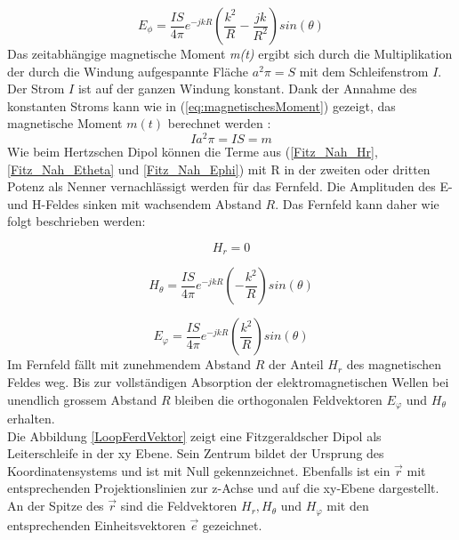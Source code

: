 \begin{equation}
E_\phi= \frac{I S}{4\pi}   e^{-jkR} \left( \frac{k^{2}}{R}  - \frac{jk}{R^{2}} \right) sin(\theta)
\label{Fitz_Nah_Ephi}
\end{equation}
Das zeitabhängige magnetische Moment \textit{m(t)} ergibt sich durch die Multiplikation der durch die Windung aufgespannte Fläche $a^{2}\pi=S$ mit dem  Schleifenstrom $I$. Der Strom $I$ ist auf der ganzen Windung konstant. Dank der Annahme des konstanten Stroms kann wie in (\ref{eq:magnetischesMoment}) gezeigt, das magnetische Moment $m(t)$ berechnet werden \cite{Harrington-TimeHarmonic}: 
\begin{equation}\label{eq:magnetischesMoment}
Ia^{2}\pi=IS=m
\end{equation}
Wie beim Hertzschen Dipol können die Terme aus (\ref{Fitz_Nah_Hr}, \ref{Fitz_Nah_Etheta} und \ref{Fitz_Nah_Ephi}) mit R in der zweiten oder dritten Potenz als Nenner vernachlässigt werden für das Fernfeld. Die Amplituden des E- und H-Feldes sinken mit wachsendem Abstand $R$. Das Fernfeld kann daher wie folgt beschrieben werden:

\begin{equation}
H_r= 0
\end{equation}

\begin{equation}
H_\theta= \frac{I S}{4\pi}   e^{-jkR} \left(- \frac{k^{2}}{R}   \right) sin(\theta)
\end{equation}

\begin{equation}
E_\varphi= \frac{I S}{4\pi}   e^{-jkR} \left( \frac{k^{2}}{R}   \right) sin(\theta)
\end{equation}
Im Fernfeld fällt mit zunehmendem Abstand $R$ der Anteil  $H_r$ des magnetischen Feldes weg. Bis zur vollständigen Absorption der elektromagnetischen Wellen bei unendlich grossem Abstand $R$ bleiben die orthogonalen Feldvektoren $ E_\varphi $ und $ H_\theta $ erhalten.\\



Die Abbildung \ref{LoopFerdVektor} zeigt eine Fitzgeraldscher Dipol als Leiterschleife in der xy Ebene. Sein Zentrum bildet der Ursprung des Koordinatensystems und ist mit Null gekennzeichnet. Ebenfalls ist ein $\vec{r}$ mit entsprechenden Projektionslinien zur z-Achse und auf die xy-Ebene dargestellt. An der Spitze des $\vec{r}$ sind die Feldvektoren $H_{r}, H_{\theta}$ und $H_{\varphi}$ mit den entsprechenden Einheitsvektoren $\vec{e}$ gezeichnet.
\newpage

